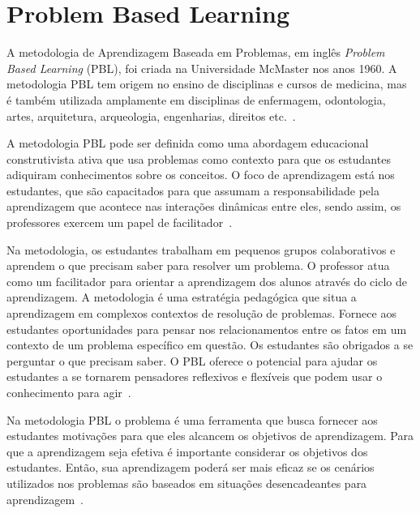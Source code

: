 \acresetall
\section{Problem Based Learning}

A metodologia de Aprendizagem Baseada em Problemas, em
inglês \textit{Problem Based Learning} (PBL),
foi criada na Universidade McMaster nos anos 1960.
A metodologia PBL tem origem no ensino de disciplinas e cursos de medicina,
mas é também utilizada amplamente em disciplinas de enfermagem,
odontologia, artes, arquitetura, arqueologia, engenharias, direitos
etc.~\cite{albanese2010problem, amos1998problem}.

A metodologia PBL pode ser definida como uma abordagem educacional
construtivista ativa que usa problemas como contexto para que os estudantes
adiquiram conhecimentos sobre os conceitos. O foco de aprendizagem está
nos estudantes, que são capacitados para que assumam a responsabilidade pela
aprendizagem que acontece nas interações dinâmicas
entre eles, sendo assim, os professores exercem um papel
de facilitador~\cite{dolmans2005problem, albanese2010problem,
amos1998problem, forsythe2002problem}.

Na metodologia, os estudantes trabalham em pequenos grupos colaborativos
e aprendem o que precisam saber para resolver um problema.
O professor atua como um facilitador para orientar a aprendizagem
dos alunos através do ciclo
de aprendizagem.
A metodologia é uma estratégia pedagógica que situa a aprendizagem em
complexos contextos de resolução de problemas.
Fornece aos estudantes oportunidades para pensar nos relacionamentos
entre os fatos em um contexto de um problema específico em questão.
Os estudantes são obrigados a se perguntar o que precisam saber.
O PBL oferece o potencial para ajudar os estudantes a se tornarem
pensadores reflexivos e flexíveis que podem usar o conhecimento
para agir~\cite{hmelo2004problem}.

Na metodologia PBL o problema é uma ferramenta que busca fornecer
aos estudantes motivações para que eles alcancem os
objetivos de aprendizagem.
Para que a aprendizagem seja efetiva é importante considerar os objetivos
dos estudantes.
Então, sua aprendizagem poderá ser mais eficaz se os cenários utilizados
nos problemas são baseados em situações desencadeantes para
aprendizagem~\cite{wood2003problem, o2012practical, amos1998problem}.

